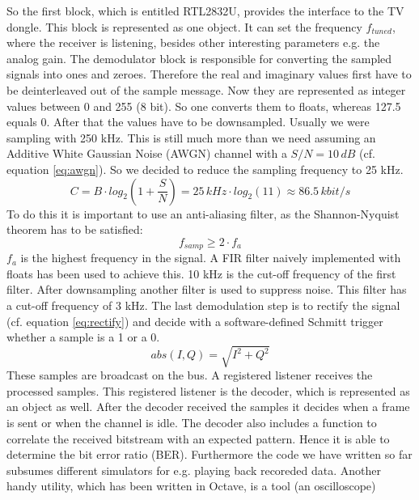 \documentclass[conference]{IEEEtran}
\begin{document}
So the first block, which is entitled RTL2832U,
provides the interface to the TV dongle. This block is represented as
one object. It can set the frequency \ensuremath{f_{tuned}}, where the
receiver is listening, besides other interesting parameters e.g. the
analog gain.
The demodulator block is responsible for converting the sampled signals
into ones and zeroes. Therefore the real and imaginary values first have
to be deinterleaved out of the sample message. Now they are represented
as integer values between 0 and 255 (8 bit). So one converts them to
floats, whereas 127.5 equals 0. After that the values have to be
downsampled. Usually we were sampling with 250 kHz. This is still much
more than we need assuming an Additive White Gaussian Noise (AWGN)
channel with a \ensuremath{S/N = 10\,dB} (cf.  equation \ref{eq:awgn}).
So we decided to reduce the sampling frequency to 25 kHz.
\begin{equation}
	\label{eq:awgn}
	C=B \cdot log_2(1+\frac{S}{N})= 25\,kHz \cdot log_2(11) \approx 86.5\,kbit/s
\end{equation}     
To do this it is important to use an anti-aliasing filter, as the Shannon-Nyquist theorem has to be satisfied: 
\begin{equation}
	\label{eq:nyquist}
	f_{samp} \geq 2 \cdot f_{a}
\end{equation}
\ensuremath{f_{a}} is the highest frequency in the signal. 
 A FIR
filter naively implemented with floats has been used to achieve this. 10
kHz is the cut-off frequency of the first filter. After downsampling
another filter is used to suppress noise. This filter has a cut-off
frequency of 3 kHz. The last demodulation step is to rectify the signal
(cf. equation \ref{eq:rectify}) and decide with a software-defined
Schmitt trigger whether a sample is a 1 or a 0.  
\begin{equation}
	\label{eq:rectify}
	abs(I,Q) = \sqrt{I^2 +  Q^2}
\end{equation} 
These samples are broadcast on the bus. A registered listener receives
the processed samples. This registered listener is the decoder, which is
represented as an object as well. After the decoder received the samples
it decides when a frame is sent or when the channel is idle.  The
decoder also includes a function to correlate the received bitstream
with an expected pattern. Hence it is able to determine the bit error
ratio (BER). Furthermore the code we have written so far subsumes
different simulators for e.g. playing back recoreded data. Another handy
utility, which has been written in Octave, is a tool (an oscilloscope)
\end{document}
